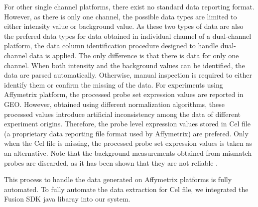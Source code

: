 %
%
For other single channel platforms, there exist no standard data reporting
format.  However, as there is only one channel, the possible data types are
limited to either intensity value or background value.
%
As these two types of data are also the prefered data types for data obtained
in individual channel of a dual-channel platform, the data column
identification procedure designed to handle dual-channel data is applied.
%
The only difference is that there is data for only one channel.  
%
When both intensity and the background values can be identified, the data are
parsed automatically.  Otherwise, manual inspection is required to either
identify them or confirm the missing of the data.
%
%
%
For experiments using Affymetrix platform, the processed probe set expression
values are reported in GEO.
%
However, obtained using different normalization algorithms, these processed
values introduce artificial inconsistency among the data of different
experiment origins.
%
Therefore, the probe level expression values stored in Cel file (a proprietary
data reporting file format used by Affymetrix) are prefered.
%
Only when the Cel file is missing, the processed probe set expression values is
taken as an alternative.
%
Note that the background measurements obtained from mismatch probes are
discarded, as it has been shown that they are not reliable \cite{...}.
%



%
This process to handle the data generated on Affymetrix platforms is fully
automated.
%
To fully automate the data extraction for Cel file, we integrated the Fusion
SDK java libaray into our system.
%






